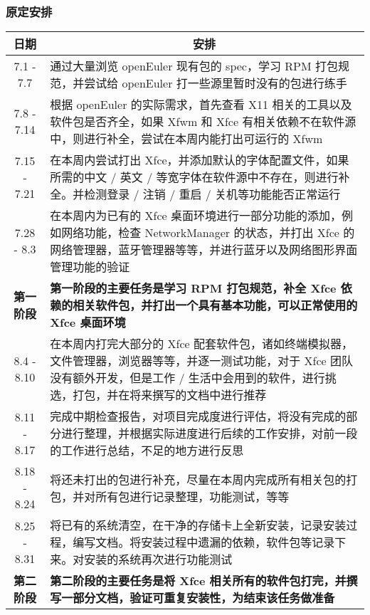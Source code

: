 \documentclass[letterpaper,12pt]{article}
\begin{document}
\subsubsection{原定安排}
\begin{table}[!ht]
    \setlength\extrarowheight{2pt}
    \begin{tabularx}{\textwidth}{|c|X|}
    \hline
    日期        & \multicolumn{1}{c|}{安排} \\
    \hline
    7.1 - 7.7   & 通过大量浏览 openEuler 现有包的 spec，学习 RPM 打包规范，并尝试给 openEuler 打一些源里暂时没有的包进行练手                                      \\ \hline
    7.8 - 7.14  & 根据 openEuler 的实际需求，首先查看 X11 相关的工具以及软件包是否齐全，如果 Xfwm 和 Xfce 有相关依赖不在软件源中，则进行补全，尝试在本周内能打出可运行的 Xfwm             \\ \hline
    7.15 - 7.21 & 在本周内尝试打出 Xfce，并添加默认的字体配置文件，如果所需的中文 / 英文 / 等宽字体在软件源中不存在，则进行补全。并检测登录 / 注销 / 重启 / 关机等功能能否正常运行                 \\ \hline
    7.28 - 8.3  & 在本周内为已有的 Xfce 桌面环境进行一部分功能的添加，例如网络功能，检查 NetworkManager 的状态，并打出 Xfce 的网络管理器，蓝牙管理器等等，并进行蓝牙以及网络图形界面管理功能的验证     \\ \hline
    \textbf{第一阶段}    & \textbf{第一阶段的主要任务是学习 RPM 打包规范，补全 Xfce 依赖的相关软件包，并打出一个具有基本功能，可以正常使用的 Xfce 桌面环境} \\ \hline
    8.4 - 8.10  & 在本周内打完大部分的 Xfce 配套软件包，诸如终端模拟器，文件管理器，浏览器等等，并逐一测试功能，对于 Xfce 团队没有额外开发，但是工作 / 生活中会用到的软件，进行挑选，打包，并在将来撰写的文档中进行推荐 \\ \hline
    8.11 - 8.17 & 完成中期检查报告，对项目完成度进行评估，将没有完成的部分进行整理，并根据实际进度进行后续的工作安排，对前一段的工作进行总结，不足的地方进行反思                                    \\ \hline
    8.18 - 8.24 & 将还未打出的包进行补充，尽量在本周内完成所有相关包的打包，并对所有包进行记录整理，功能测试，等等                                                           \\ \hline
    8.25 - 8.31 & 将已有的系统清空，在干净的存储卡上全新安装，记录安装过程，编写文档。将安装过程中遗漏的依赖，软件包等记录下来。对安装的系统再次进行功能测试                                      \\ \hline
    \textbf{第二阶段}    & \textbf{第二阶段的主要任务是将 Xfce 相关所有的软件包打完，并撰写一部分文档，验证可重复安装性，为结束该任务做准备} \\ \hline

\end{tabularx}
\end{table}
\end{document}
